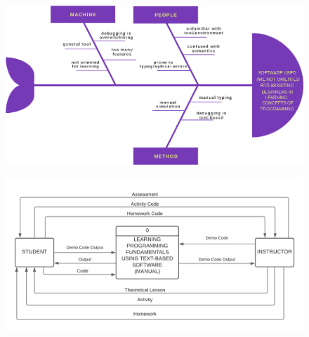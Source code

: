 \begin{doublespace}
\begin{center}
		\clearpage
		\null\vfill
		\begin{figure}[H]
			\centering
			\includegraphics[width=0.8\textheight,angle=90]{figures/fishbone3.png}
			\label{fig:fishbone3}
		\end{figure}
		\label{fishbone3}
		\vfill

		\clearpage
		\null\vfill
		\captionsetup[figure]{list=no}
		\begin{figure}[H]
			\centering
			\includegraphics[width=\textwidth]{figures/context_diagram_manual.png}
			\caption{}
			\label{fig:context_diagram_manual}
		\end{figure}
		\vfill


\end{center}
\end{doublespace}
